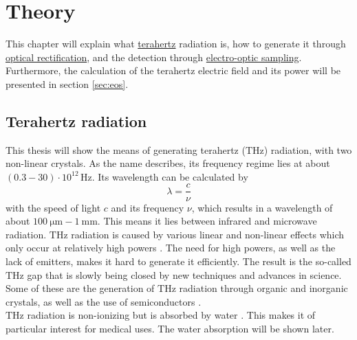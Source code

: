 \chapter{Theory}
\label{sec:theory}
This chapter will explain what \hyperref[sec:terahertz]{terahertz} radiation is, how to generate it through \hyperref[sec:optic_ref]{optical rectification}, and the detection through \hyperref[sec:eos]{electro-optic sampling}.
Furthermore, the calculation of the terahertz electric field and its power will be presented in section \ref{sec:eos}.
\section{Terahertz radiation}
\label{sec:terahertz}
This thesis will show the means of generating terahertz ($\si{\tera\hertz}$) radiation, with two non-linear crystals.
As the name describes, its frequency regime lies at about \\${(0.3-30)\cdot10^{12}\,\si{\hertz}}$.
Its wavelength can be calculated by
\begin{equation}
    \lambda = \frac{c}{\nu}
\end{equation}
with the speed of light $c$ and its frequency $\nu$, which results in a wavelength of about $\SI{100}{\micro\meter}-\SI{1}{\milli\meter}$.
This means it lies between infrared and microwave radiation.
$\si{\tera\hertz}$ radiation is caused by various linear and non-linear effects which only occur at relatively high powers \cite{Thz_sources}.
The need for high powers, as well as the lack of emitters, makes it hard to generate it efficiently.
The result is the so-called $\si{\tera\hertz}$ gap that is slowly being closed by new techniques and advances in science.
Some of these are the generation of $\si{\tera\hertz}$ radiation through organic and inorganic crystals, as well as the use of semiconductors \cite{sources_thz}.
\\
$\si{\tera\hertz}$ radiation is non-ionizing but is absorbed by water \cite{water_absorption}.
This makes it of particular interest for medical uses.
The water absorption will be shown later. 


